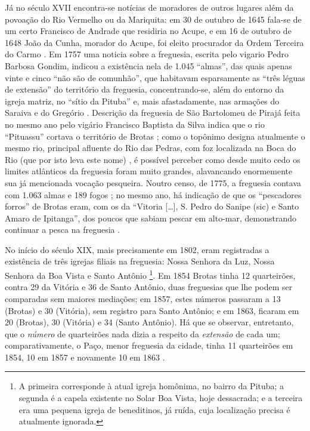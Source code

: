 Já no século XVII encontra-se notícias de moradores de outros lugares além da povoação do Rio Vermelho ou da Mariquita: em 30 de outubro de 1645 fala-se de um certo Francisco de Andrade que residiria no Acupe, e em 16 de outubro de 1648 João da Cunha, morador do Acupe, foi eleito procurador da Ordem Terceira do Carmo \cite[p.~21]{ott_formaet2_1957}. Em 1757 uma noticia sobre a freguesia, escrita pelo vigario Pedro Barbosa Gondim, indicou a existência nela de 1.045 ``almas'', das quais apenas vinte e cinco ``não são de comunhão'', que habitavam esparsamente as ``três léguas de extensão'' do território da freguesia, concentrando-se, além do entorno da igreja matriz, no ``sítio da Pituba'' e, mais afastadamente, nas armações do Saraiva e do Gregório \cite[p.~183]{castralmeida_ultramar_1908}. Descrição da freguesia de São Bartolomeu de Pirajá feita no mesmo ano pelo vigário Francisco Baptista da Silva indica que o rio ``Pituassu'' cortava o território de Brotas \cite[p.~218]{castralmeida_ultramar_1908}; como o topônimo designa atualmente o mesmo rio, principal afluente do Rio das Pedras, com foz localizada na Boca do Rio (que por isto leva este nome) \cite[p.~175-177]{santos_aguas_2010}, é possível perceber como desde muito cedo os limites atlânticos da freguesia foram muito grandes, alavancando enormemente sua já mencionada vocação pesqueira. Noutro censo, de 1775, a freguesia contava com 1.063 almas e 189 fogos \cite[p.~183]{castralmeida_ultramar_1910}; no mesmo ano, há indicação de que os ``pescadores forros'' de Brotas eram, com os da ``Vitoria [\dots], S. Pedro do Sanipe (sic) e Santo Amaro de Ipitanga'', dos poucos que sabiam pescar em alto-mar, demonstrando continuar a pesca na freguesia \cite[p.~294]{castralmeida_ultramar_1910}.

No início do século XIX, mais precisamente em 1802, eram registradas a existência de três igrejas filiais na freguesia: Nossa Senhora da Luz, Nossa Senhora da Boa Vista e Santo Antônio \cite[p.~172]{VASCONCELOS2002}\footnote{A primeira corresponde à atual igreja homônima, no bairro da Pituba; a segunda é a capela existente no Solar Boa Vista, hoje dessacrada; e a terceira era uma pequena igreja de beneditinos, já ruída, cuja localização precisa é atualmente ignorada.}. Em 1854 Brotas tinha 12 quarteirões, contra 29 da Vitória e 36 de Santo Antônio, duas freguesias que lhe podem ser comparadas sem maiores mediações; em 1857, estes números passaram a 13 (Brotas) e 30 (Vitória), sem registro para Santo Antônio; e em 1863, ficaram em 20 (Brotas), 30 (Vitória) e 34 (Santo Antônio). Há que se observar, entretanto, que o \textit{número} de quarteirões nada dizia a respeito da \textit{extensão} de cada um; comparativamente, o Paço, menor freguesia da cidade, tinha 11 quarteirões em 1854, 10 em 1857 e novamente 10 em 1863 \cite[p.~46]{NASCIMENTO2007}.


